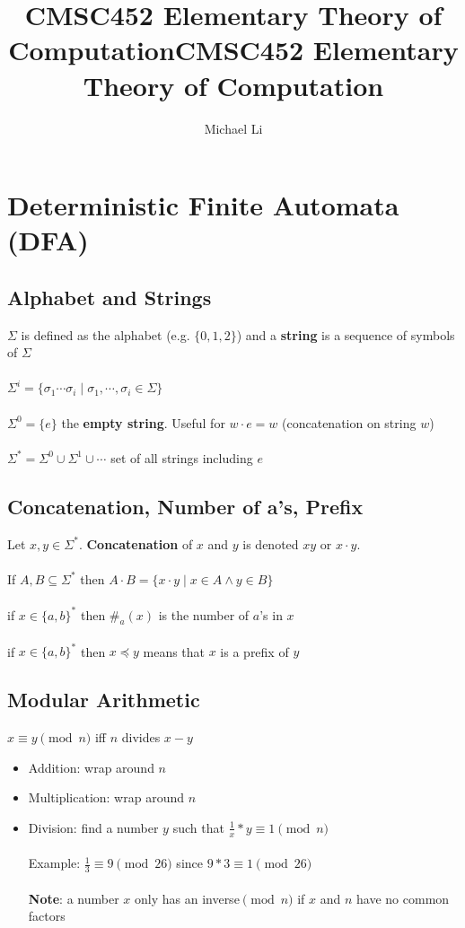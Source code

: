 \documentclass{article}
\date{}
\title{CMSC452 Elementary Theory of Computation}
\begin{document}
 
  \author{Michael Li}
  \title{CMSC452 Elementary Theory of Computation}
  \maketitle
  \tableofcontents
  \newpage
  \section{Deterministic Finite Automata (DFA)}
  \subsection{Alphabet and Strings}
  $\Sigma$ is defined as the alphabet (e.g. $\{0, 1, 2\}$) and a \textbf{string} is a sequence of symbols of $\Sigma$ \\ \\
  $\Sigma^i = \{\sigma_1 \cdots \sigma_i \mid \sigma_1, \cdots, \sigma_i \in \Sigma \}$ \\ \\
  $\Sigma^0 = \{e\}$ the \textbf{empty string}. Useful for $w \cdot e = w$ (concatenation on string $w$) \\ \\
  $\Sigma^* = \Sigma^0 \cup \Sigma^1 \cup \cdots$ set of all strings including $e$ 
  \subsection{Concatenation, Number of a's, Prefix}
  Let $x, y \in \Sigma^*$. \textbf{Concatenation} of $x$ and $y$ is denoted $xy$ or $x \cdot y$. \\ \\
  If $A, B \subseteq \Sigma^*$ then $A \cdot B = \{ x \cdot y \mid x \in A \wedge y \in B\}$ \\ \\
  if $x \in \{a, b\}^*$ then $\#_a(x)$ is the number of $a$'s in $x$ \\ \\
  if $x \in \{a, b\}^*$ then $x \preceq y$ means that $x$ is a prefix of $y$
  \subsection{Modular Arithmetic}
  $x \equiv y \pmod{n}$ iff $n$ divides $x - y$
  \begin{itemize}
    \item Addition: wrap around $n$
    \item Multiplication: wrap around $n$
    \item Division: find a number $y$ such that $\frac{1}{x} * y \equiv 1 \pmod{n}$ \\ \\
      Example: $\frac{1}{3} \equiv 9\pmod{26}$ since $9 * 3 \equiv 1 \pmod{26}$ \\ \\
      \textbf{Note}: a number $x$ only has an inverse$\pmod n$ if $x$ and $n$ have no common factors
  \end{itemize}
\end{document}
